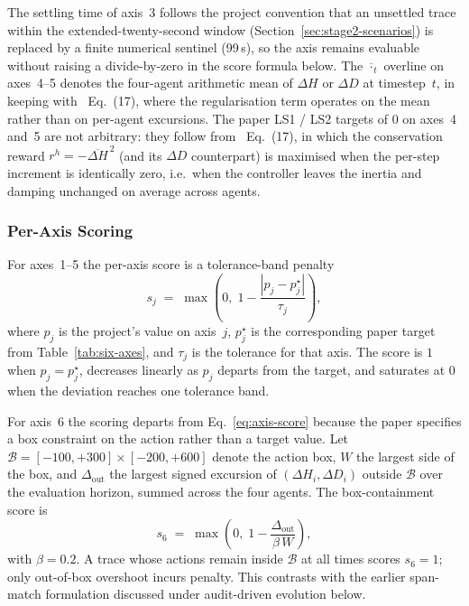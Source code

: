 \documentclass{unnc-fyp}
\begin{document}
The settling time of axis~3 follows the project convention that an
unsettled trace within the extended-twenty-second window
(Section~\ref{sec:stage2-scenarios}) is replaced by a finite
numerical sentinel (99\,s), so the axis remains evaluable without
raising a divide-by-zero in the score formula below.
The $\overline{\cdot}_t$ overline on axes~4--5 denotes the
four-agent arithmetic mean of $\Delta H$ or $\Delta D$ at
timestep~$t$, in keeping with~\cite{yang2023ddic} Eq.~(17), where
the regularisation term operates on the mean rather than on
per-agent excursions.
The paper LS1 / LS2 targets of $0$ on axes~4 and~5 are not
arbitrary: they follow from~\cite{yang2023ddic} Eq.~(17), in which
the conservation reward $r^{h} = -\overline{\Delta H}^{\,2}$ (and
its $\Delta D$ counterpart) is maximised when the per-step
increment is identically zero, i.e.\ when the controller leaves
the inertia and damping unchanged on average across agents.

\subsubsection{Per-Axis Scoring}

For axes~1--5 the per-axis score is a tolerance-band penalty
\begin{equation}
  s_j \;=\; \max\!\left(0,\;
            1 - \frac{|p_j - p_j^{\star}|}{\tau_j}\right),
  \label{eq:axis-score}
\end{equation}
where $p_j$ is the project's value on axis~$j$, $p_j^{\star}$ is the
corresponding paper target from Table~\ref{tab:six-axes}, and
$\tau_j$ is the tolerance for that axis.
The score is $1$ when $p_j = p_j^{\star}$, decreases linearly as
$p_j$ departs from the target, and saturates at $0$ when the
deviation reaches one tolerance band.

For axis~6 the scoring departs from Eq.~\eqref{eq:axis-score}
because the paper specifies a box constraint on the action rather
than a target value.
Let $\mathcal{B} = [-100, +300] \times [-200, +600]$ denote the
action box, $W$ the largest side of the box, and $\Delta_\mathrm{out}$
the largest signed excursion of $(\Delta H_i, \Delta D_i)$ outside
$\mathcal{B}$ over the evaluation horizon, summed across the four
agents.
The box-containment score is
\begin{equation}
  s_6 \;=\; \max\!\left(0,\;
            1 - \frac{\Delta_\mathrm{out}}{\beta\,W}\right),
  \label{eq:box-score}
\end{equation}
with $\beta = 0.2$.
A trace whose actions remain inside $\mathcal{B}$ at all times
scores $s_6 = 1$; only out-of-box overshoot incurs penalty.
This contrasts with the earlier span-match formulation discussed
under audit-driven evolution below.
\end{document}
